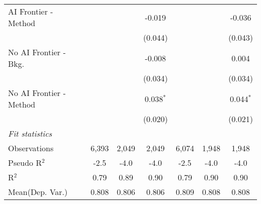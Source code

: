 \begin{tabular}{lcccccc}
   AI Frontier - Method    &               &               & -0.019       &              &              & -0.036\\   
                           &               &               & (0.044)      &              &              & (0.043)\\   
   No AI Frontier - Bkg.   &               &               & -0.008       &              &              & 0.004\\   
                           &               &               & (0.034)      &              &              & (0.034)\\   
   No AI Frontier - Method &               &               & 0.038$^{*}$  &              &              & 0.044$^{*}$\\   
                           &               &               & (0.020)      &              &              & (0.021)\\   
   \midrule
   \emph{Fit statistics}\\
   Observations            & 6,393         & 2,049         & 2,049        & 6,074        & 1,948        & 1,948\\  
   Pseudo R$^2$            & -2.5          & -4.0          & -4.0         & -2.5         & -4.0         & -4.0\\  
   R$^2$                   & 0.79          & 0.89          & 0.90         & 0.79         & 0.90         & 0.90\\  
Mean(Dep. Var.) & 0.808 & 0.806 & 0.806 & 0.809 & 0.808 & 0.808 \\
   

\end{tabular}
